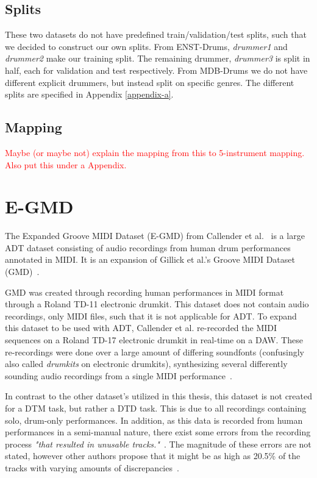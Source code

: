 \subsection{Splits}

These two datasets do not have predefined train/validation/test splits, such that we decided to construct our own splits. From ENST-Drums, \textit{drummer1} and \textit{drummer2} make our training split. The remaining drummer, \textit{drummer3} is split in half, each for validation and test respectively. From MDB-Drums we do not have different explicit drummers, but instead split on specific genres. The different splits are specified in Appendix \ref{appendix-a}.

\subsection{Mapping}

\textcolor{red}{Maybe (or maybe not) explain the mapping from this to 5-instrument mapping. Also put this under a Appendix.}

\section{E-GMD}

The Expanded Groove MIDI Dataset (E-GMD) from Callender et al.~\cite{callender2020improvingperceptualqualitydrum} is a large \gls{ADT} dataset consisting of audio recordings from human drum performances annotated in MIDI. It is an expansion of Gillick et al.'s Groove MIDI Dataset (GMD)~\cite{pmlr-v97-gillick19a}.

GMD was created through recording human performances in MIDI format through a Roland TD-11 electronic drumkit. This dataset does not contain audio recordings, only MIDI files, such that it is not applicable for \gls{ADT}. To expand this dataset to be used with \gls{ADT}, Callender et al. re-recorded the MIDI sequences on a Roland TD-17 electronic drumkit in real-time on a \gls{DAW}. These re-recordings were done over a large amount of differing soundfonts (confusingly also called \textit{drumkits} on electronic drumkits), synthesizing several differently sounding audio recordings from a single MIDI performance~\cite{pmlr-v97-gillick19a, callender2020improvingperceptualqualitydrum}.

In contrast to the other dataset's utilized in this thesis, this dataset is not created for a \gls{DTM} task, but rather a \gls{DTD} task. This is due to all recordings containing solo, drum-only performances. In addition, as this data is recorded from human performances in a semi-manual nature, there exist some errors from the recording process \textit{"that resulted in unusable tracks."}~\cite{callender2020improvingperceptualqualitydrum}. The magnitude of these errors are not stated, however other authors propose that it might be as high as 20.5\% of the tracks with varying amounts of discrepancies~\cite{holz2021automatic}.

